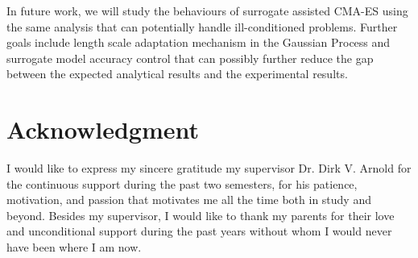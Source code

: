 In future work, we will study the behaviours of surrogate assisted CMA-ES using the same analysis that can potentially handle ill-conditioned problems. Further goals include length scale adaptation mechanism in the Gaussian Process and surrogate model accuracy control that can possibly further reduce the gap between the expected analytical results and the experimental results. 

\section*{Acknowledgment}
I would like to express my sincere gratitude my supervisor Dr. Dirk V. Arnold for the continuous support during the past two semesters, for his patience, motivation, and passion that motivates me all the time both in study and beyond. Besides my supervisor, I would like to thank my parents for their love and unconditional support during the past years without whom I would never have been where I am now.







